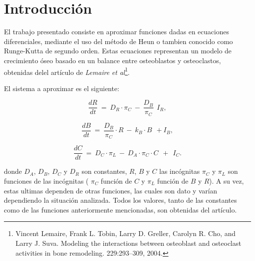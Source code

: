 \documentclass[a4paper]{article}
\begin{document}





\section{Introducción}

El trabajo presentado consiste en aproximar funciones dadas en ecuaciones diferenciales, mediante el uso del método de Heun o tambien conocido como Runge-Kutta de segundo orden. Estas ecuaciones representan un modelo de crecimiento óseo basado en un balance entre osteoblastos y osteoclastos, obtenidas delel artículo de \textit{Lemaire et al}\footnote{Vincent Lemaire, Frank L. Tobin, Larry D. Greller, Carolyn R. Cho, and
Larry J. Suva. Modeling the interactions between osteoblast and osteoclast
activities in bone remodeling. 229:293–309, 2004.}.

El sistema a aproximar es el siguiente:

\begin{equation}
\frac{dR}{dt} \ = \ D_R \cdot {\pi}_{C} \ - \ \frac{D_B}{{\pi}_{C}} \ \ {I}_{R},
\end{equation}

\begin{equation}
\frac{dB}{dt} \ = \ \frac{D_B}{{\pi}_{C}} \cdot R \ - \ k_B \cdot B \ \ + {I}_{B},
\end{equation}

\begin{equation}
\frac{dC}{dt} \ = \ D_C \cdot {\pi}_{L} \ - \ D_A \cdot	{\pi}_{C} \cdot C \ \ + \ \ {I}_{C}.
\end{equation}

donde ${D}_{A}$, ${D}_{B}$, ${D}_{C}$ y ${D}_{R}$ son constantes, $R$, $B$ y $C$ las incógnitas ${\pi}_{C}$ y ${\pi}_{L}$ son funciones de las incógnitas ( ${\pi}_{C} $ función de $ C $ y $ {\pi}_{L} $ función de $B$ y $R$). A su vez, estas ultimas dependen de otras funciones, las cuales son dato y varían dependiendo la situación analizada. Todos los valores, tanto de las constantes como de las funciones anteriormente mencionadas, son obtenidas del artículo.
\end{document}
